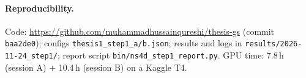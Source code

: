 \documentclass[11pt,a4paper]{article}
\begin{document}
\paragraph{Reproducibility.} Code: \url{https://github.com/muhammadhussainqureshi/thesis-gs} (commit \texttt{baa2de0});
configs \texttt{thesis1\_step1\_a/b.json}; results and logs in \texttt{results/2026-11-24\_step1/}; report script
\texttt{bin/ns4d\_step1\_report.py}. GPU time: 7.8\,h (session A) + 10.4\,h (session B) on a Kaggle T4.
\end{document}
